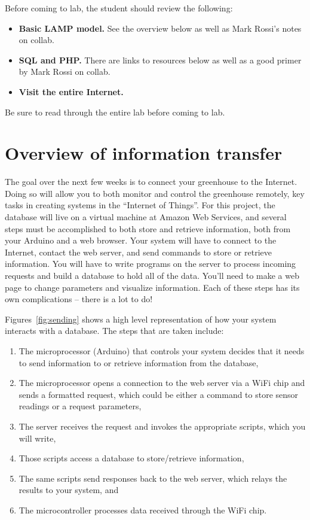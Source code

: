 \documentclass[11pt]{article} %
\begin{document}
Before coming to lab, the student should review the following:

\begin{itemize}
\item {\bf Basic LAMP model.} See the overview below as well as Mark Rossi’s notes on collab.
\item {\bf SQL and PHP.} There are links to resources below as well as a good primer by Mark Rossi on collab.
\item {\bf Visit the entire Internet.}
\end{itemize}

Be sure to read through the entire lab before coming to lab.

\section{Overview of information transfer}

The goal over the next few weeks is to connect your greenhouse to the Internet. Doing so will allow you to both monitor and control the greenhouse remotely, key tasks in creating systems in the “Internet of Things”. For this project, the database will live on a virtual machine at Amazon Web Services, and several steps must be accomplished to both store and retrieve information, both from your Arduino and a web browser. Your system will have to connect to the Internet, contact the web server, and send commands to store or retrieve information. You will have to write programs on the server to process incoming requests and build a database to hold all of the data. You’ll need to make a web page to change parameters and visualize information. Each of these steps has its own complications -- there is a lot to do!

Figures~\ref{fig:sending} shows a high level representation of how your system interacts with a database. The steps that are taken include:
\begin{enumerate}
\item The microprocessor (Arduino) that controls your system decides that it needs to send information to or retrieve information from the database,
\item The microprocessor opens a connection to the web server via a WiFi chip and sends a formatted request, which could be either a command to store sensor readings or a request parameters,
\item The server receives the request and invokes the appropriate scripts, which you will write,
\item Those scripts access a database to store/retrieve information,
\item The same scripts send responses back to the web server, which relays the results to your system, and 
\item The microcontroller processes data received through the WiFi chip.
\end{enumerate}
\end{document}
